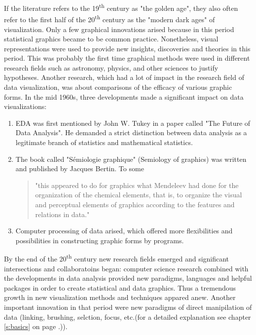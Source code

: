 If the literature refers to the 19\textsuperscript{th} century as "the golden age", they also often refer to the first half of the 20\textsuperscript{th} century as the "modern dark ages" of visualization. Only a few graphical innovations arised because in this period statistical graphics became to be common practice. Nonetheless, visual representations were used to provide new insights, discoveries and theories in this period. This was probably the first time graphical methods were used in different research fields such as astronomy, physics, and other sciences to justify hypotheses. Another research, which had a lot of impact in the research field of data visualization, was about comparisons of the efficacy of various graphic forms. In the mid 1960s, three developments made a significant impact on data visualizations:
\begin{enumerate}
\item \ac{EDA} was first mentioned by John W. Tukey in a paper called "The Future of Data Analysis". He demanded a strict distinction between data analysis as a legitimate branch of statistics and mathematical statistics.
\item The book called "Sémiologie graphique" (Semiology of graphics) was written and published by Jacques Bertin. To some
\begin{quote}
"this appeared to do for graphics what Mendeleev had done for the organization of the chemical elements, that is, to organize the visual and perceptual elements of graphics according to the features and relations in data."
\end{quote}
\item Computer processing of data arised, which offered more flexibilities and possibilities in constructing graphic forms by programs.
\end{enumerate}

By the end of the 20\textsuperscript{th} century new research fields emerged and significant intersections and collaboratoins began: computer science research combined with the developments in data analysis provided new paradigms, languages and helpful packages in order to create statistical and data graphics. Thus a tremendous growth in new visualization methods and techniques appared anew.
Another important innovation in that period were new paradigms of direct manipilation of data (linking, brushing, selction, focus, etc.(for a detailed explanation see chapter \ref{s:basics} on page \pageref{s:basics}.)).